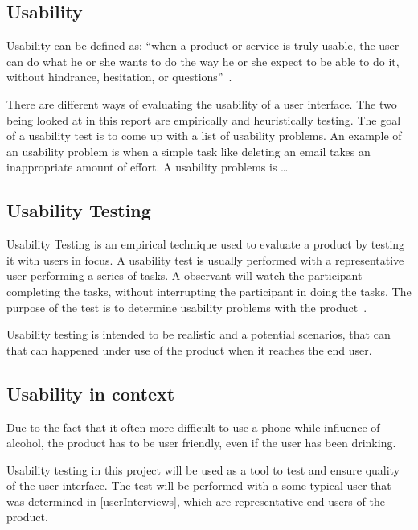 \subsection{Usability}
\label{sub:usability}

Usability can be defined as: \enquote{when a product or service is truly usable, the user can do what he or she wants to do the way he or she expect to be able to do it, without hindrance, hesitation, or questions}~\cite{RubinChisnellSpool08}.

There are different ways of evaluating the usability of a user interface. The two being looked at in this report are empirically and heuristically testing. The goal of a usability test is to come up with a list of usability problems. An example of an usability problem is when a simple task like deleting an email takes an inappropriate amount of effort.  A usability problems is \dots {}

\subsection{Usability Testing}
Usability Testing is an empirical technique used to evaluate a product by testing it with users in focus. A usability test is usually performed with a representative user performing a series of tasks. A observant will watch the participant completing the tasks, without interrupting the participant in doing the tasks. The purpose of the test is to determine usability problems with the product~\cite{RubinChisnellSpool08}.


Usability testing is intended to be realistic and a potential scenarios, that can that can happened under use of the product when it reaches the end user.

\subsection{Usability in context}
\label{sub:usability_in_context}

Due to the fact that it often more difficult to use a phone while influence of alcohol, the product has to be user friendly, even if the user has been drinking.

Usability testing in this project will be used as a tool to test and ensure quality of the user interface. The test will be performed with a some typical user that was determined in \cref{userInterviews}, which are representative end users of the product.

